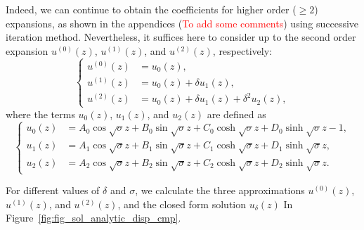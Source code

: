 \documentclass{article}
\begin{document}
Indeed, we can continue to obtain the coefficients for higher order ($\geq 2$) expansions, as shown in the appendices (\textcolor{red}{To add some comments}) using successive iteration method. Nevertheless, it suffices here to consider up to the second order expansion $u^{(0)} (z)$, $u^{(1)} (z)$, and $u^{(2)} (z)$, respectively:
\begin{equation}
    \left\{\begin{aligned}
        u^{(0)} (z) &= u_0 (z), \\
        u^{(1)} (z) &= u_0 (z) + \delta u_1(z), \\
        u^{(2)} (z) &= u_0 (z) + \delta u_1(z) + \delta^2 u_2 (z),
    \end{aligned}\right.
\end{equation}
where the terms $u_0 (z)$, $u_1(z)$, and $u_2 (z)$ are defined as
\begin{equation}
    \left\{\begin{aligned}
        u_0 (z) &= A_0 \cos{\sqrt{\sigma}z} + B_0 \sin{\sqrt{\sigma}z} + C_0 \cosh{\sqrt{\sigma}z} + D_0 \sinh{\sqrt{\sigma}z} - 1, \\
        u_1 (z) &= A_1 \cos{\sqrt{\sigma}z} + B_1 \sin{\sqrt{\sigma}z} + C_1 \cosh{\sqrt{\sigma}z} + D_1 \sinh{\sqrt{\sigma}z}, \\
        u_2 (z) &= A_2 \cos{\sqrt{\sigma}z} + B_2 \sin{\sqrt{\sigma}z} + C_2 \cosh{\sqrt{\sigma}z} + D_2 \sinh{\sqrt{\sigma}z}.
    \end{aligned}\right.
\end{equation}


For different values of $\delta$ and $\sigma$, we calculate the three approximations $u^{(0)}(z)$, $u^{(1)}(z)$, and $u^{(2)}(z)$, and the closed form solution $u_\delta(z)$ In Figure~\ref{fig:fig_sol_analytic_disp_cmp}.
\end{document}
